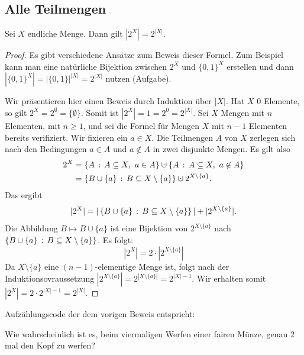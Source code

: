 \subsection{Alle Teilmengen} 

\begin{thm}
	Sei $X$ endliche Menge. Dann gilt $|2^X|=2^{|X|}$. 
\end{thm} 
\begin{proof} 
	Es gibt verschiedene Ansätze zum Beweis dieser Formel. Zum Beispiel kann man eine natürliche Bijektion zwischen  $2^X$ und $\{0,1\}^X$ erstellen und dann $|\{0,1\}^X| = |\{0,1\}|^{|X|} = 2^{|X|}$ nutzen (Aufgabe). 
	
	Wir präsentieren hier einen Beweis durch Induktion über $|X|$. Hat $X$ $0$ Elemente, so gilt $2^X = 2^\emptyset = \{\emptyset\}$. Somit ist $|2^X| = 1 = 2^0 = 2^{|X|}$. Sei $X$ Mengen mit $n$ Elementen, mit $n \ge 1$, und sei die Formel für Mengen $X$ mit $n-1$ Elementen bereits verifiziert. Wir fixieren ein $a \in X$. Die Teilmengen $A$ von $X$ zerlegen sich nach den Bedingungen $a \in A$ und $a \not\in A$ in zwei disjunkte Mengen. Es gilt also
	\begin{align*}
			2^X & = \setcond{A}{A \subseteq X, \ a \in A} \cupdot \setcond{A}{A \subseteq X, \ a \not\in A}
			\\ & = \setcond{B \cup \{a\}}{B \subseteq X \setminus \{a\}} \cupdot 2^{X \setminus \{a\}}. 
	\end{align*}
	Das ergibt
	\[
		|2^X| = |\left\{ B \cup \{a\} \,:\, B \subseteq X \setminus \{a\} \right\}| + | 2^{X \setminus \{a\}}|. 
	\]
	Die Abbildung $B \mapsto B \cup \{a\}$ ist eine Bijektion von $2^{X \setminus \{a\}}$ nach $\left\{ B \cup \{a\} \,:\, B \subseteq X \setminus \{a\} \right\}$. Es folgt: 
	\[
		|2^X| = 2 \cdot |2^{X \setminus \{a\}}|
	\]
	Da $X \setminus \{a\}$ eine $(n-1)$-elementige Menge ist, folgt nach der Induktionsovraussetzung $|2^{X \setminus \{a\}}| = 2^{|X \setminus \{a\}|} = 2^{|X|-1}$. Wir erhalten somit $|2^{X}| = 2 \cdot 2^{|X|-1} = 2^{|X|}$. 
\end{proof} 

\begin{bem} Aufzählungscode der dem vorigen Beweis entspricht: 

\end{bem} 

\begin{aufg}
	Wie wahrscheinlich ist es, beim viermaligen Werfen einer fairen Münze, genau $2$ mal den Kopf zu werfen?
\end{aufg} 

